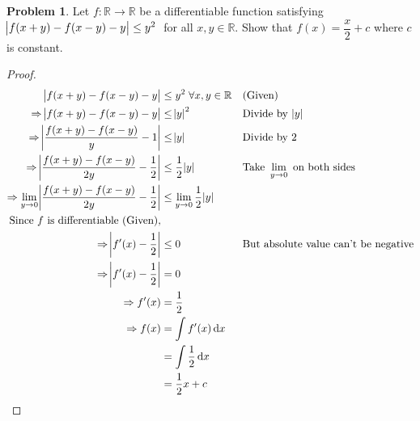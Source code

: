 \documentclass[14]{article}
\theoremstyle{definition}
\newtheorem{prob}{Problem}
\begin{document}
\begin{prob}
Let $f : \mathbb{R} \to \mathbb{R}$ be a differentiable function satisfying $\abs{f(x+y) - f(x-y) - y} \leq y^2 \; $ for all $x, y \in \mathbb{R}$. Show that $f(x) = \dfrac x2 + c$ where $c$ is constant.
\begin{proof}
\begin{align*}
\abs{f(x+y) - f(x-y) - y} &\leq y^2 \; \forall x, y \in \mathbb{R} && \text{(Given)}\\
\Rightarrow \abs{f(x+y) - f(x-y) - y} &\leq \abs{y}^2 && \text{Divide by } \abs{y}\\
\Rightarrow \abs{\dfrac{f(x+y) - f(x-y)}{y} - 1} &\leq \abs{y} && \text{Divide by } 2\\
\Rightarrow \abs{\dfrac{f(x+y) - f(x-y)}{2y} - \dfrac12} &\leq \dfrac12 \abs{y} &&  \text{Take } \lim\limits_{y\to 0} \text{ on both sides}\\
\Rightarrow \lim\limits_{y\to 0} \abs{\dfrac{f(x+y) - f(x-y)}{2y} - \dfrac12} &\leq \lim\limits_{y\to 0} \dfrac12 \abs{y}\\
\text{Since } f \text{ is differentiable (Given),}\\
\Rightarrow \abs{f'(x) - \dfrac12} &\leq 0 && \text{But absolute value can't be negative}\\
\Rightarrow \abs{f'(x) - \dfrac12} &= 0\\
\Rightarrow f'(x) &= \dfrac12\\
\Rightarrow f(x) &= \int f'(x) \dif x\\
&= \int \dfrac12 \dif x\\
&= \dfrac12 x + c
\end{align*}
\end{proof}
\end{prob}
\pagebreak
\end{document}
